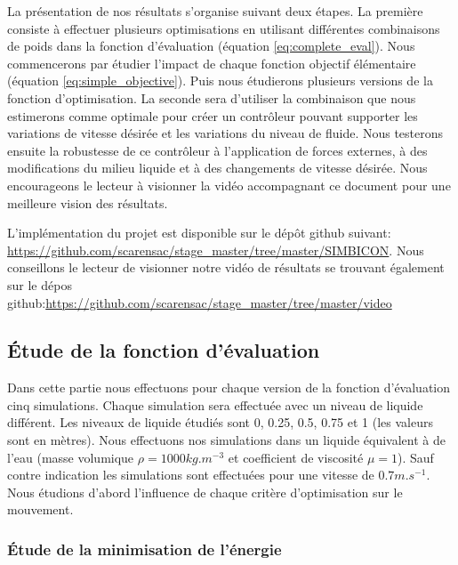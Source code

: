 \documentclass[runningheads,a4paper]{llncs}
\begin{document}
La présentation de nos résultats s'organise suivant deux étapes. La première consiste à effectuer plusieurs optimisations en utilisant différentes combinaisons de poids dans la fonction d'évaluation (équation \ref{eq:complete_eval}). Nous commencerons par étudier l'impact de chaque fonction objectif élémentaire (équation \ref{eq:simple_objective}). Puis nous étudierons plusieurs versions de la fonction d'optimisation. La seconde sera d'utiliser la combinaison que nous estimerons comme optimale pour créer un contrôleur pouvant supporter les variations de vitesse désirée et les variations du niveau de fluide. Nous testerons ensuite la robustesse de ce contrôleur à l'application de forces externes, à des modifications du milieu liquide et à des changements de vitesse désirée. Nous encourageons le lecteur à visionner la vidéo accompagnant ce document pour une meilleure vision des résultats.

L'implémentation du projet est disponible sur le dépôt github suivant: \url{https://github.com/scarensac/stage_master/tree/master/SIMBICON}. Nous conseillons le lecteur de visionner notre vidéo de résultats se trouvant également sur le dépos github:\url{https://github.com/scarensac/stage_master/tree/master/video}

\subsection{Étude de la fonction d'évaluation}

Dans cette partie nous effectuons pour chaque version de la fonction d'évaluation cinq simulations. Chaque simulation sera effectuée avec un niveau de liquide différent. Les niveaux de liquide étudiés sont 0, 0.25, 0.5, 0.75 et 1 (les valeurs sont en mètres). Nous effectuons nos simulations dans un liquide équivalent à de l'eau (masse volumique $\rho =1000kg.m^{-3}$ et coefficient de viscosité  $\mu =1$). Sauf contre indication les simulations sont effectuées pour une vitesse de $0.7m.s^{-1}$. Nous étudions d'abord l'influence de chaque critère d'optimisation sur le mouvement.

\subsubsection{Étude de la minimisation de l'énergie}
\end{document}
